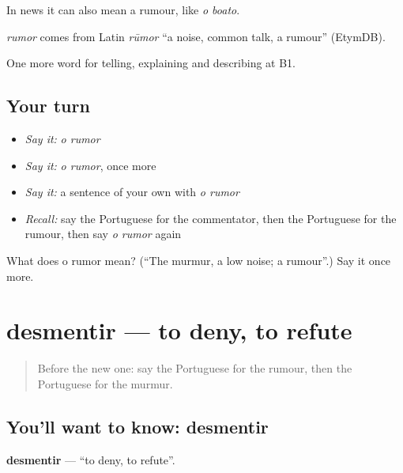 In news it can also mean a rumour, like \emph{o boato}.

\begin{cousinweb}
\emph{rumor} comes from Latin \emph{rūmor} \textquotedblleft{}a noise, common talk, a rumour\textquotedblright{} (EtymDB).
\end{cousinweb}

\begin{grammarlens}[title={What you've built}]
One more word for telling, explaining and describing at B1.
\end{grammarlens}

\subsection*{Your turn}
\begin{itemize}
\raggedright
  \item \emph{Say it:} \emph{o rumor}
  \item \emph{Say it:} \emph{o rumor}, once more
  \item \emph{Say it:} a sentence of your own with \emph{o rumor}
  \item \emph{Recall:} say the Portuguese for the commentator, then the Portuguese for the rumour, then say \emph{o rumor} again
\end{itemize}

\begin{tcolorbox}[breakable,colback=teal!4,colframe=teal!35!black,title={Before you move on}]
What does o rumor mean? (\textquotedblleft{}The murmur, a low noise; a rumour\textquotedblright{}.) Say it once more.
\end{tcolorbox}
\section[desmentir]{desmentir — to deny, to refute}

\label{lesson:PT-C283-desmentir}



\begin{quote}
Before the new one: say the Portuguese for the rumour, then the Portuguese for the murmur.
\end{quote}

\subsection*{You'll want to know: desmentir}
\textbf{desmentir} — \textquotedblleft{}to deny, to refute\textquotedblright{}.

